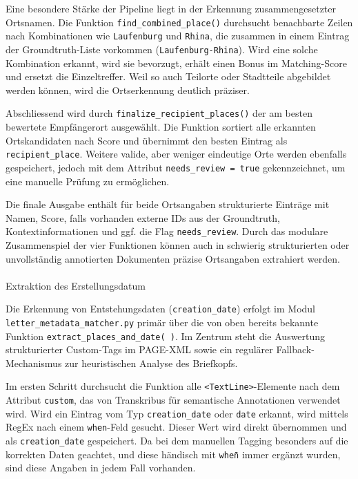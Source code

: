 \documentclass[12pt, a4paper, ngerman, bidi=default]{article}
\makeatletter
\newcommand{\code}[1]{\colorbox{VeryLightGray}{\texttt{#1}}} %
\let\oldparagraph\paragraph%
\renewcommand{\paragraph}{
    \@ifstar%
      \xxxParagraphStar%
      \xxxParagraphNoStar%
 }
\newcommand{\xxxParagraphStar}[1]{\oldparagraph*{#1}\mbox{}}
\newcommand{\xxxParagraphNoStar}[1]{\oldparagraph{#1}\mbox{}}
\makeatother
\begin{document}
Eine besondere Stärke der Pipeline liegt in der Erkennung zusammengesetzter Ortsnamen. Die Funktion \code{find\_combined\_place()} durchsucht benachbarte Zeilen nach Kombinationen wie \texttt{Laufenburg} und \texttt{Rhina}, die zusammen in einem Eintrag der Groundtruth-Liste vorkommen (\texttt{Laufenburg-Rhina}). Wird eine solche Kombination erkannt, wird sie bevorzugt, erhält einen Bonus im Matching-Score und ersetzt die Einzeltreffer. Weil so auch Teilorte oder Stadtteile abgebildet werden können, wird die Ortserkennung deutlich präziser.

Abschliessend wird durch \code{finalize\_recipient\_places()} der am besten bewertete Empfängerort ausgewählt. Die Funktion sortiert alle erkannten Ortskandidaten nach Score und übernimmt den besten Eintrag als \code{recipient\_place}. Weitere valide, aber weniger eindeutige Orte werden ebenfalls gespeichert, jedoch mit dem Attribut \code{needs\_review = true} gekennzeichnet, um eine manuelle Prüfung zu ermöglichen.

Die finale Ausgabe enthält für beide Ortsangaben strukturierte Einträge mit Namen, Score, falls vorhanden externe IDs aus der Groundtruth, Kontextinformationen und ggf. die Flag \code{needs\_review}. Durch das modulare Zusammenspiel der vier Funktionen können auch in schwierig strukturierten oder unvollständig annotierten Dokumenten präzise Ortsangaben extrahiert werden.

\paragraph{Extraktion des Erstellungsdatum}

Die Erkennung von Entstehungsdaten (\code{creation\_date}) erfolgt im Modul \code{letter\_metadata\_matcher.py} primär über die von oben bereits bekannte Funktion \code{extract\_places\_and\_date( )}. Im Zentrum steht die Auswertung strukturierter Custom-Tags im PAGE-XML sowie ein regulärer Fallback-Mechanismus zur heuristischen Analyse des Briefkopfs.

Im ersten Schritt durchsucht die Funktion alle \code{<TextLine>}-Elemente nach dem Attribut \code{custom}, das von Transkribus für semantische Annotationen verwendet wird. Wird ein Eintrag vom Typ \texttt{creation\_date} oder \texttt{date} erkannt, wird mittels RegEx nach einem \texttt{when}-Feld gesucht. Dieser Wert wird direkt übernommen und als \code{creation\_date} gespeichert. Da bei dem manuellen Tagging besonders auf die korrekten Daten geachtet, und diese händisch mit \code{when\=} immer ergänzt wurden, sind diese Angaben in jedem Fall vorhanden.
\end{document}

